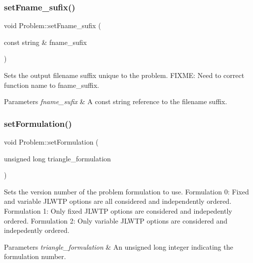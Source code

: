 \subsubsection{\texorpdfstring{set\+Fname\+\_\+sufix()}{setFname\_sufix()}}
{\footnotesize\ttfamily void Problem\+::set\+Fname\+\_\+sufix (\begin{DoxyParamCaption}\item[{const string \&}]{fname\+\_\+sufix }\end{DoxyParamCaption})}



Sets the output filename suffix unique to the problem. F\+I\+X\+ME\+: Need to correct function name to fname\+\_\+suffix. 


\begin{DoxyParams}{Parameters}
{\em fname\+\_\+sufix} & A const string reference to the filename suffix. \\
\hline
\end{DoxyParams}
\mbox{\label{classProblem_aeb825305f6bdf0df0cadcf0bb7da458f}} 
\subsubsection{\texorpdfstring{set\+Formulation()}{setFormulation()}}
{\footnotesize\ttfamily void Problem\+::set\+Formulation (\begin{DoxyParamCaption}\item[{unsigned long}]{triangle\+\_\+formulation }\end{DoxyParamCaption})}



Sets the version number of the problem formulation to use. Formulation 0\+: Fixed and variable J\+L\+W\+TP options are all considered and independently ordered. Formulation 1\+: Only fixed J\+L\+W\+TP options are considered and indepedently ordered. Formulation 2\+: Only variable J\+L\+W\+TP options are considered and indepedently ordered. 


\begin{DoxyParams}{Parameters}
{\em triangle\+\_\+formulation} & An unsigned long integer indicating the formulation number. \\
\hline
\end{DoxyParams}
\mbox{\label{classProblem_abd1e1e82b44c6ce5f7dc22e0534a6cac}} 
